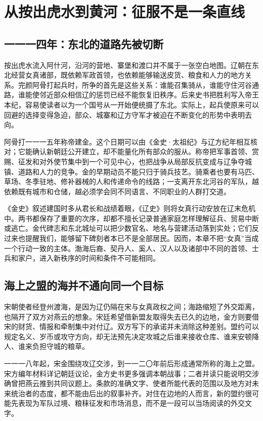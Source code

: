\section{从按出虎水到黄河：征服不是一条直线}

\subsection{一一一四年：东北的道路先被切断}

按出虎水流入阿什河，沿河的营地、寨堡和渡口并不属于一张空白地图。辽朝在东北经营女真诸部，既依赖军政首领，也依赖能够输送皮货、粮食和人力的地方关系。完颜阿骨打起兵时，所争的首先是这些关系：谁能召集骑从，谁能守住河谷通路，谁能使邻近部众相信辽的惩罚已经不能恢复旧秩序。后来史书把胜利写入帝王本纪，容易使读者以为一个国号从一开始便统摄了东北。实际上，起兵使原来可以回避的选择变得急迫，部众、城寨和辽方守军才被迫在不断变化的形势中表明去向。

阿骨打一一一五年称帝建金。这个日期可以由《金史·太祖纪》与辽方纪年相互核对；它能确认新朝廷公开建立，却不能量化所有部众的服从。称帝把军事首领、赏赐、征发和对外使节集中到一个可见中心，也把战争从局部反抗变成与辽争夺城镇、道路和人力的竞争。金的早期动员不能只归于骑兵技艺。骑乘者也要有马匹、草场、冬季驻地、修补器械的人和传递命令的线路；一支离开东北河谷的军队，越依赖既有城市和仓储，越必须学会同不同语言、不同职业的人群打交道。

《金史》叙述建国时多从君长和战绩着眼，《辽史》则将女真行动安放在辽末危机中。两书都保存了重要的次序，却都不擅长记录普通家庭怎样理解征兵、贸易中断或逃亡。金代碑志和东北城址可以把少数官名、地名与营建活动落到实处；它们反过来也提醒我们，能够留下碑刻者本已不是全部居民。因而，本章不把“女真”当成一个行动一致的主体。渤海后裔、契丹人、奚人、汉人以及诸部中不同的首领、士兵和家户，进入新秩序的时间和条件不可能相同。

\subsection{海上之盟的海并不通向同一个目标}

宋朝使者经登州渡海，是因为辽仍隔在宋与女真政权之间；海路缩短了外交距离，也隔开了双方对燕云的想象。宋廷希望借新盟友取得失去已久的边地，金方则要借宋的财货、情报和牵制集中对付辽。双方写下的承诺并未消除这种差别。盟约可以规定名义、岁币或攻守方向，却无法预先决定攻城之后谁来接收仓库、谁来安顿降人、谁来负担守城的粮草。

一一一八年起，宋金围绕攻辽交涉，到一一二〇年前后形成通常所称的海上之盟。宋方编年材料详记朝廷议论，金方史书更多强调本朝战事；二者并读只能说明交涉确曾把燕云推到共同议题上。条款的准确文字、使者所能代表的范围以及地方对未来统治者的态度，都不能由后出的叙事补齐。对住在边地的人而言，新的盟约很可能先表现为军队过境、粮秣征发和市场消息，而不是一段可以当场阅读的外交文字。

